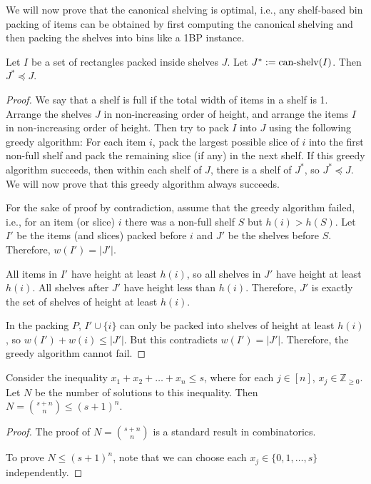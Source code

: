 We will now prove that the canonical shelving is optimal,
i.e., any shelf-based bin packing of items can be obtained
by first computing the canonical shelving and then
packing the shelves into bins like a 1BP instance.

\begin{lemma}
\label{thm:hgap:can-shelv-pred}
Let $I$ be a set of rectangles packed inside shelves $J$.
Let $J^* := \operatorname{can-shelv}(I)$. Then $J^* \preceq J$.
\end{lemma}
\begin{proof}
We say that a shelf is full if the total width of items in a shelf is 1.
Arrange the shelves $J$ in non-increasing order of height,
and arrange the items $I$ in non-increasing order of height.
Then try to pack $I$ into $J$ using the following greedy algorithm:
For each item $i$, pack the largest possible slice of $i$ into
the first non-full shelf and pack the remaining slice (if any) in the next shelf.
If this greedy algorithm succeeds, then within each shelf of $J$,
there is a shelf of $J^*$, so $J^* \preceq J$.
We will now prove that this greedy algorithm always succeeds.

For the sake of proof by contradiction, assume that the greedy algorithm failed, i.e.,
for an item (or slice) $i$ there was a non-full shelf $S$ but $h(i) > h(S)$.
Let $I'$ be the items (and slices) packed before $i$ and $J'$ be the shelves before $S$.
Therefore, $w(I') = |J'|$.

All items in $I'$ have height at least $h(i)$,
so all shelves in $J'$ have height at least $h(i)$.
All shelves after $J'$ have height less than $h(i)$.
Therefore, $J'$ is exactly the set of shelves of height at least $h(i)$.

In the packing $P$, $I' \cup \{i\}$ can only be packed into shelves of height
at least $h(i)$, so $w(I') + w(i) \le |J'|$. But this contradicts $w(I') = |J'|$.
Therefore, the greedy algorithm cannot fail.
\end{proof}

\begin{lemma}
\label{thm:nos-sum}
Consider the inequality $x_1 + x_2 + \ldots + x_n \le s$,
where for each $j \in [n]$, $x_j \in \mathbb{Z}_{\ge 0}$.
Let $N$ be the number of solutions to this inequality.
Then $N = \binom{s+n}{n} \le (s+1)^n$.
\end{lemma}
\begin{proof}
The proof of $N = \binom{s+n}{n}$ is a standard result in combinatorics.

To prove $N \le (s+1)^n$, note that we can choose each
$x_j \in \{0, 1, \ldots, s\}$ independently.
\end{proof}

